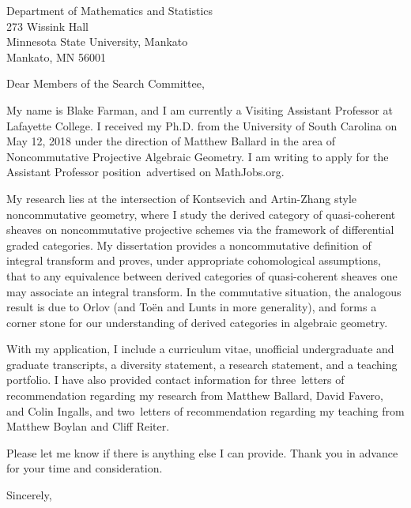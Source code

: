 \documentclass[10pt]{letter}
\date{\today}
\def\position{Assistant Professor position}
\def\posloc{MathJobs.org}
\def\materials{a curriculum vitae,
  unofficial undergraduate and graduate transcripts,
  a diversity statement,
  a research statement,
  and a teaching portfolio}
\def\numresrefs{three}
\def\numteachrefs{two}
\def\refs{Matthew Ballard,
  David Favero,
  and Colin Ingalls}
\def\teachingrefs{Matthew Boylan and Cliff Reiter}
\def\ReferencesBlurbListOnly{I have also provided contact information for \numresrefs\ letters of recommendation regarding my research from \refs, and \numteachrefs\ letters of recommendation regarding my teaching from \teachingrefs.}
\def\ReferencesBlurbBoth{I have also arranged for \numresrefs\  letters of recommendation regarding my research from \refs, and \numteachrefs\ letters of recommendation regarding my teaching from \teachingrefs.}
\def\ReferencesBlurbResearchOnly{
  I have also arranged for \numresrefs\ letters of recommendation regarding my research from \refs.}
\def\researchblurb{My research lies at the intersection of Kontsevich and Artin-Zhang style noncommutative geometry, where I study the derived category of quasi-coherent sheaves on noncommutative projective schemes via the framework of differential graded categories.
  My dissertation provides a noncommutative definition of integral transform and proves, under appropriate cohomological assumptions, that to any equivalence between derived categories of quasi-coherent sheaves one may associate an integral transform.
  In the commutative situation, the analogous result is due to Orlov (and To\"{e}n and Lunts in more generality), and forms a corner stone for our understanding of derived categories in algebraic geometry.}
\def\teachingblurb{As an instructor, I have a deep appreciation for the beauty and power of mathematics that I am always excited to share with students.
  I have a wealth of experience as instructor of record for undergraduate courses ranging from college algebra to calculus II.
  In addition, I have delivered guest lectures, seminars, and colloquium talks aimed at the graduate level.
  A list of courses that I have taught can be found in my curriculum vitae, and detailed information about those courses are available on my website.
}
\def\diversityblurb{In all the courses that I teach, I feel that it is imperative to foster an inclusive environment.
  It is my firmly held belief that everyone should have equal access to education and, along this line, I believe that traditionally underrepresented groups should be embraced and encouraged, a sentiment shared by the community at Lafayette College.
  During my time here, I have had the opportunity to review literature regarding inclusivity in STEM, and to discuss these ideas and their implementation with fellow faculty members.
  I have also taken the opportunity to participate in biweekly teaching lunches within the mathematics department, where colleagues share their philosophies and methods for fostering an inclusive and effective teaching environment.
  As a direct result, I have incorporated examples from various disciplines which are relevant to students' lives, and implemented active learning techniques to reach a wide variety of learning styles.
  I look forward to the opportunity to continuing this work as my career progresses.}
\begin{document}
\begin{letter}{
    Department of Mathematics and Statistics\\
    273 Wissink Hall\\
    Minnesota State University, Mankato\\
    Mankato, MN 56001
}
  \opening{Dear Members of the Search Committee,}
  
  My name is Blake Farman, and I am currently a Visiting Assistant Professor at Lafayette College.
  I received my Ph.D. from the University of South Carolina on May 12, 2018 under the direction of Matthew Ballard in the area of Noncommutative Projective Algebraic Geometry.
  I am writing to apply for the \position\ advertised on \posloc.

  \researchblurb

  
  With my application, I include \materials.
  \ReferencesBlurbListOnly

  Please let me know if there is anything else I can provide.
  Thank you in advance for your time and consideration.
  \closing{Sincerely,}
\end{letter}
\end{document}
